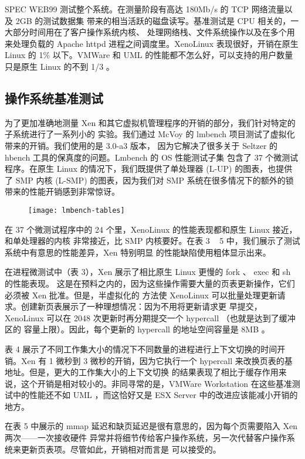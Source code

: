 SPEC WEB99 测试整个系统。在测量阶段有高达 180Mb/s 的 TCP 网络流量以及 2GB 的测试数据集
带来的相当活跃的磁盘读写。基准测试是 CPU 相关的，一大部分时间用在了客户操作系统内核、
处理网络栈、文件系统操作以及在多个用来处理负载的 Apache httpd 进程之间调度里。XenoLinux
表现很好，开销在原生 Linux 的 1\% 以下。VMWare 和 UML 的性能都不怎么好，可以支持的用户数量
只是原生 Linux 的不到 1/3 。

\subsection{操作系统基准测试}

为了更加准确地测量 Xen 和其它虚拟机管理程序的开销的部分，我们针对特定的子系统进行了一系列小的
实验。我们通过 McVoy 的 lmbench 项目测试了虚拟化带来的开销。我们使用的是 3.0-a3 版本，
因为它解决了很多关于 Seltzer 的 hbench 工具的保真度的问题。Lmbench 的 OS 性能测试子集
包含了 37 个微测试程序。在原生 Linux 的情况下，我们既提供了单处理器 (L-UP) 的图表，也提供了
SMP 内核 (L-SMP) 的图表，因为我们对 SMP 系统在很多情况下的额外的锁带来的性能开销感到非常惊讶。

\begin{figure}[h]
    \centering
    \texttt{[image: lmbench-tables]}
\end{figure}

在 37 个微测试程序中的 24 个里，XenoLinux 的性能表现都和原生 Linux 接近，和单处理器的内核
非常接近，比 SMP 内核要好。在表 3 ~ 5 中，我们展示了测试系统中有意思的性能差异，Xen 特别明显
的性能缺陷使用粗体显示出来。

在进程微测试中（表 3），Xen 展示了相比原生 Linux 更慢的 fork 、 exec 和 sh 的性能表现。
这是在预料之内的，因为这些操作需要大量的页表更新操作，它们必须被 Xen 批准。但是，半虚拟化的
方法使 XenoLinux 可以批量处理更新请求。创建新页表展示了一种理想情况：因为不用将更新请求更
早提交，XenoLinux 可以在 2048 次更新时再分期提交一个 hypercall （也就是达到了缓冲区的
容量上限）。因此，每个更新的 hypercall 的地址空间容量是 8MB 。

表 4 展示了不同工作集大小的情况下不同数量的进程进行上下文切换的时间开销。Xen 有 1 微秒到 3
微秒的开销，因为它执行一个 hypercall 来改换页表的基地址。但是，更大的工作集大小的上下文切换
的结果表现了相比于缓存作用来说，这个开销是相对较小的。非同寻常的是，VMWare Workstation
在这些基准测试中的性能还不如 UML ，而这恰好又是 ESX Server 中的改进应该能减小开销的地方。

在表 5 中展示的 mmap 延迟和缺页延迟是很有意思的，因为每个页需要陷入 Xen 两次——一次接收硬件
异常并将细节传给客户操作系统，另一次代替客户操作系统来更新页表项。尽管如此，开销相对而言是
可以接受的。

